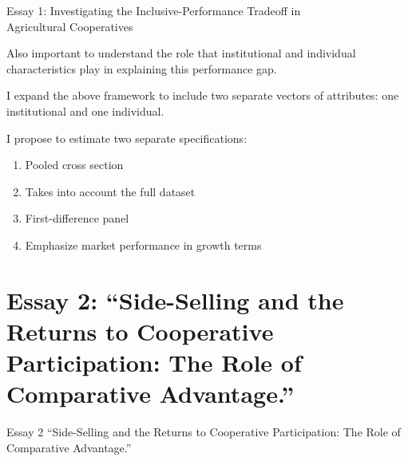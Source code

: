 \documentclass[aspectratio=169]{beamer}
\newenvironment{wideitemize}{\itemize\addtolength{\itemsep}{10pt}}{\enditemize}
\begin{document}
\begin{frame}{Essay 1: Investigating the Inclusive-Performance Tradeoff in \\ \hspace{1.7cm} Agricultural Cooperatives}
    \begin{wideitemize}
        \item Also important to understand the role that institutional and individual characteristics play in explaining this performance gap. 
        \item I expand the above framework to include two separate vectors of attributes: one institutional and one individual. 
        \item I propose to estimate two separate specifications: \vspace{.25cm}
            \begin{enumerate}
                \item Pooled cross section
                    \begin{wideitemize}
                        \item Takes into account the full dataset \vspace{.25cm}
                    \end{wideitemize}
                \item First-difference panel
                    \begin{wideitemize}
                        \item Emphasize market performance in growth terms
                    \end{wideitemize}
            \end{enumerate}
    \end{wideitemize}    
\end{frame}


\section{Essay 2: ``Side-Selling and the Returns to Cooperative Participation: The Role of Comparative Advantage.''}
\begin{frame}{Essay 2}
\centering
\Large{``Side-Selling and the Returns to Cooperative Participation: The Role of Comparative Advantage.''}
\end{frame}
\end{document}
